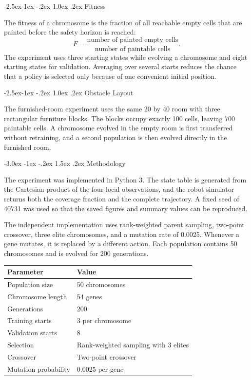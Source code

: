 \documentclass[12pt,a4paper]{article}
\makeatletter
\renewcommand{\section}{\@startsection{section}{1}{\z@}%
  {-3.0ex \@plus -1ex \@minus -.2ex}%
  {1.5ex \@plus.2ex}%
  {\normalfont\Large\bfseries\color{primaryblue}}}
\renewcommand{\subsection}{\@startsection{subsection}{2}{\z@}%
  {-2.5ex\@plus -1ex \@minus -.2ex}%
  {1.0ex \@plus .2ex}%
  {\normalfont\large\bfseries\color{accentblue}}}
\makeatother
\begin{document}
\subsection{Fitness}

The fitness of a chromosome is the fraction of all reachable empty cells that are painted before the safety horizon is reached:
\[
  F = \frac{\text{number of painted empty cells}}
           {\text{number of paintable cells}}.
\]
The experiment uses three starting states while evolving a chromosome and eight starting states for validation.  Averaging over several starts reduces the chance that a policy is selected only because of one convenient initial position.

\subsection{Obstacle Layout}

The furnished-room experiment uses the same 20 by 40 room with three rectangular furniture blocks.  The blocks occupy exactly 100 cells, leaving 700 paintable cells.  A chromosome evolved in the empty room is first transferred without retraining, and a second population is then evolved directly in the furnished room.

\section{Methodology}

The experiment was implemented in Python 3.  The state table is generated from the Cartesian product of the four local observations, and the robot simulator returns both the coverage fraction and the complete trajectory.  A fixed seed of 40731 was used so that the saved figures and summary values can be reproduced.

The independent implementation uses rank-weighted parent sampling, two-point crossover, three elite chromosomes, and a mutation rate of 0.0025.  Whenever a gene mutates, it is replaced by a different action.  Each population contains 50 chromosomes and is evolved for 200 generations.

\begin{center}
\begin{tabular}{ll}
\toprule
\textbf{Parameter} & \textbf{Value} \\
\midrule
Population size & 50 chromosomes \\
Chromosome length & 54 genes \\
Generations & 200 \\
Training starts & 3 per chromosome \\
Validation starts & 8 \\
Selection & Rank-weighted sampling with 3 elites \\
Crossover & Two-point crossover \\
Mutation probability & 0.0025 per gene \\
\bottomrule
\end{tabular}
\end{center}
\end{document}
